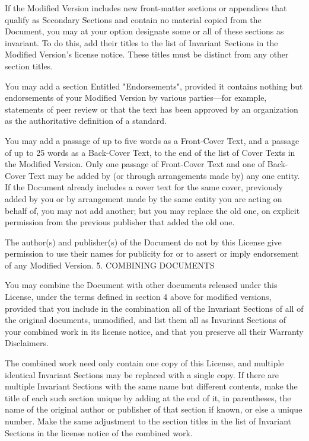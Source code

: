{\begin{multicols}{4}
If the Modified Version includes new front-matter sections or appendices that qualify as Secondary Sections and contain no material copied from the Document, you may at your option designate some or all of these sections as invariant. To do this, add their titles to the list of Invariant Sections in the Modified Version's license notice. These titles must be distinct from any other section titles.

You may add a section Entitled "Endorsements", provided it contains nothing but endorsements of your Modified Version by various parties—for example, statements of peer review or that the text has been approved by an organization as the authoritative definition of a standard.

You may add a passage of up to five words as a Front-Cover Text, and a passage of up to 25 words as a Back-Cover Text, to the end of the list of Cover Texts in the Modified Version. Only one passage of Front-Cover Text and one of Back-Cover Text may be added by (or through arrangements made by) any one entity. If the Document already includes a cover text for the same cover, previously added by you or by arrangement made by the same entity you are acting on behalf of, you may not add another; but you may replace the old one, on explicit permission from the previous publisher that added the old one.

The author(s) and publisher(s) of the Document do not by this License give permission to use their names for publicity for or to assert or imply endorsement of any Modified Version.
5. COMBINING DOCUMENTS

You may combine the Document with other documents released under this License, under the terms defined in section 4 above for modified versions, provided that you include in the combination all of the Invariant Sections of all of the original documents, unmodified, and list them all as Invariant Sections of your combined work in its license notice, and that you preserve all their Warranty Disclaimers.

The combined work need only contain one copy of this License, and multiple identical Invariant Sections may be replaced with a single copy. If there are multiple Invariant Sections with the same name but different contents, make the title of each such section unique by adding at the end of it, in parentheses, the name of the original author or publisher of that section if known, or else a unique number. Make the same adjustment to the section titles in the list of Invariant Sections in the license notice of the combined work.


\end{multicols}}
